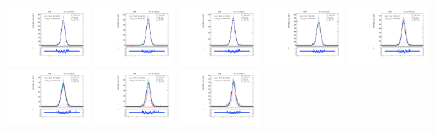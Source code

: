 \begin{figure}[htb]
\includegraphics[width=0.19\textwidth]{plots/Appendix_Recoil_Fits/ZmmData_PF_5TeV_2G_bkg/pfu1fit_16.pdf}
\includegraphics[width=0.19\textwidth]{plots/Appendix_Recoil_Fits/ZmmData_PF_5TeV_2G_bkg/pfu1fit_17.pdf}
\includegraphics[width=0.19\textwidth]{plots/Appendix_Recoil_Fits/ZmmData_PF_5TeV_2G_bkg/pfu1fit_18.pdf}
\includegraphics[width=0.19\textwidth]{plots/Appendix_Recoil_Fits/ZmmData_PF_5TeV_2G_bkg/pfu1fit_19.pdf}
\includegraphics[width=0.19\textwidth]{plots/Appendix_Recoil_Fits/ZmmData_PF_5TeV_2G_bkg/pfu1fit_20.pdf}
\includegraphics[width=0.19\textwidth]{plots/Appendix_Recoil_Fits/ZmmData_PF_5TeV_2G_bkg/pfu1fit_21.pdf}
\includegraphics[width=0.19\textwidth]{plots/Appendix_Recoil_Fits/ZmmData_PF_5TeV_2G_bkg/pfu1fit_22.pdf}
\includegraphics[width=0.19\textwidth]{plots/Appendix_Recoil_Fits/ZmmData_PF_5TeV_2G_bkg/pfu1fit_23.pdf}

\end{figure}
